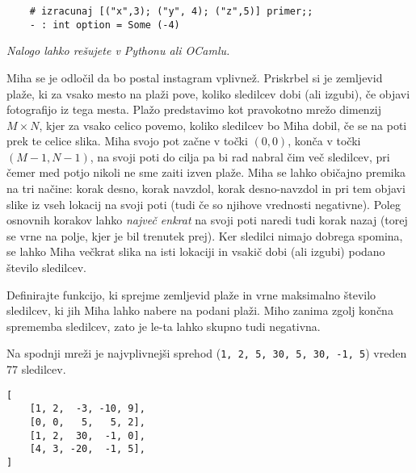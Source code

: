 \documentclass[arhiv]{../izpit}
\begin{document}
\begin{verbatim}
    # izracunaj [("x",3); ("y", 4); ("z",5)] primer;;
    - : int option = Some (-4)
\end{verbatim}

  \naloga
  
  \emph{Nalogo lahko rešujete v Pythonu ali OCamlu.}


Miha se je odločil da bo postal instagram vplivnež. Priskrbel si je zemljevid plaže, ki za vsako mesto na plaži
pove, koliko sledilcev dobi (ali izgubi), če objavi fotografijo iz tega mesta. 
Plažo predstavimo kot pravokotno mrežo dimenzij $M \times N$, kjer za vsako celico povemo, koliko sledilcev bo Miha dobil,
če se na poti prek te celice slika.
Miha svojo pot začne v točki $(0, 0)$, konča v točki $(M-1, N-1)$, na svoji poti do cilja pa bi rad nabral čim več sledilcev, 
pri čemer med potjo nikoli ne sme zaiti izven plaže.
Miha se lahko običajno premika na tri načine: korak desno, korak navzdol, korak desno-navzdol in pri tem objavi slike iz vseh lokacij
na svoji poti (tudi če so njihove vrednosti negativne). Poleg osnovnih korakov lahko \emph{največ enkrat} na svoji poti naredi tudi 
korak nazaj (torej se vrne na polje, kjer je bil trenutek prej). Ker sledilci nimajo dobrega spomina, se lahko Miha večkrat slika na isti lokaciji in vsakič dobi (ali izgubi) 
podano število sledilcev.

Definirajte funkcijo, ki sprejme zemljevid plaže in vrne maksimalno število sledilcev, ki jih Miha lahko nabere na podani plaži.
Miho zanima zgolj končna sprememba sledilcev, zato je le-ta lahko skupno tudi negativna.

Na spodnji mreži je najvplivnejši sprehod (\verb|1, 2, 5, 30, 5, 30, -1, 5|) vreden 77 sledilcev. 
\begin{verbatim}
[
    [1, 2,  -3, -10, 9],
    [0, 0,   5,   5, 2],
    [1, 2,  30,  -1, 0],
    [4, 3, -20,  -1, 5],
]
\end{verbatim}
\end{document}

